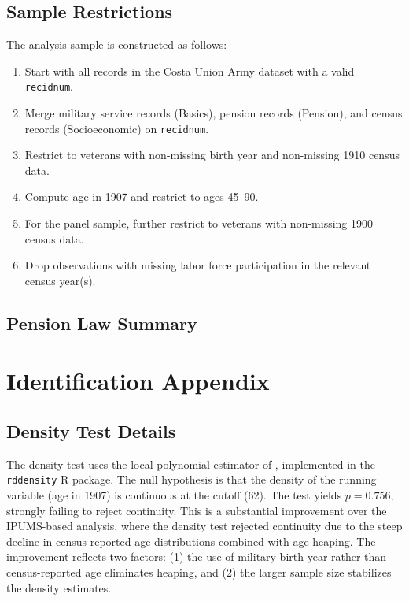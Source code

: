 \documentclass[12pt]{article}
\begin{document}
\subsection{Sample Restrictions}

The analysis sample is constructed as follows:
\begin{enumerate}
\item Start with all records in the Costa Union Army dataset with a valid \texttt{recidnum}.
\item Merge military service records (Basics), pension records (Pension), and census records (Socioeconomic) on \texttt{recidnum}.
\item Restrict to veterans with non-missing birth year and non-missing 1910 census data.
\item Compute age in 1907 and restrict to ages 45--90.
\item For the panel sample, further restrict to veterans with non-missing 1900 census data.
\item Drop observations with missing labor force participation in the relevant census year(s).
\end{enumerate}

\subsection{Pension Law Summary}



\section{Identification Appendix}

\subsection{Density Test Details}

The density test uses the local polynomial estimator of \citet{cattaneo2020rddensity}, implemented in the \texttt{rddensity} R package. The null hypothesis is that the density of the running variable (age in 1907) is continuous at the cutoff (62). The test yields $p = 0.756$, strongly failing to reject continuity. This is a substantial improvement over the IPUMS-based analysis, where the density test rejected continuity due to the steep decline in census-reported age distributions combined with age heaping. The improvement reflects two factors: (1) the use of military birth year rather than census-reported age eliminates heaping, and (2) the larger sample size stabilizes the density estimates.
\end{document}
